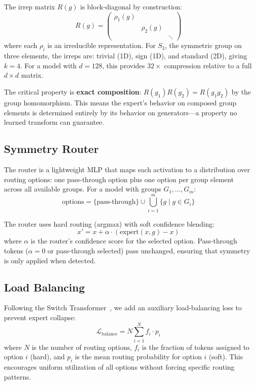 \documentclass[10pt, letterpaper]{article}
\newcommand{\Rg}{R(g)}
\begin{document}
The irrep matrix $\Rg$ is block-diagonal by construction:
\begin{equation}
    \Rg = \begin{pmatrix} \rho_1(g) & & \\ & \rho_2(g) & \\ & & \ddots \end{pmatrix}
\end{equation}
where each $\rho_i$ is an irreducible representation. For $S_3$, the symmetric group on three elements, the irreps are: trivial (1D), sign (1D), and standard (2D), giving $k = 4$. For a model with $d = 128$, this provides $32\times$ compression relative to a full $d \times d$ matrix.

The critical property is \textbf{exact composition}: $R(g_1) R(g_2) = R(g_1 g_2)$ by the group homomorphism. This means the expert's behavior on composed group elements is determined entirely by its behavior on generators---a property no learned transform can guarantee.

\subsection{Symmetry Router}

The router is a lightweight MLP that maps each activation to a distribution over routing options: one pass-through option plus one option per group element across all available groups. For a model with groups $G_1, \ldots, G_m$:
\begin{equation}
    \text{options} = \{{\text{pass-through}}\} \cup \bigcup_{i=1}^{m} \{g \mid g \in G_i\}
\end{equation}

The router uses hard routing (argmax) with soft confidence blending:
\begin{equation}
    x' = x + \alpha \cdot (\text{expert}(x, g) - x)
\end{equation}
where $\alpha$ is the router's confidence score for the selected option. Pass-through tokens ($\alpha = 0$ or pass-through selected) pass unchanged, ensuring that symmetry is only applied when detected.

\subsection{Load Balancing}

Following the Switch Transformer~\cite{fedus2022switch}, we add an auxiliary load-balancing loss to prevent expert collapse:
\begin{equation}
    \mathcal{L}_{\text{balance}} = N \sum_{i=1}^{N} f_i \cdot p_i
\end{equation}
where $N$ is the number of routing options, $f_i$ is the fraction of tokens assigned to option $i$ (hard), and $p_i$ is the mean routing probability for option $i$ (soft). This encourages uniform utilization of all options without forcing specific routing patterns.
\end{document}
